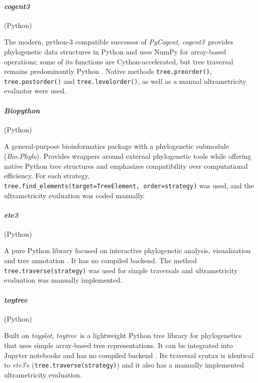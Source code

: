 \documentclass[11pt, a4paper]{article}
\newcommand{\cogent}{\textit{cogent3}}
\newcommand{\biopython}{\textit{Biopython}}
\newcommand{\ete}{\textit{ete3}}
\newcommand{\toytree}{\textit{toytree}}
\begin{document}
\paragraph{\cogent} (Python)

The modern, python-3 compatible successor of \textit{PyCogent}, \cogent\ provides phylogenetic data structures in Python and uses NumPy for array-based operations; some of its functions are Cython-accelerated, but tree traversal remains predominantly Python \cite{cogent32024,knight2007pycogent}. Native methods \texttt{tree.preorder()}, \texttt{tree.postorder()} and \texttt{tree.levelorder()}, as well as a manual ultrametricity evaluator were used. 

\paragraph{\biopython} (Python)

A general-purpose bioinformatics package with a phylogenetic submodule (\textit{Bio.Phylo}). Provides wrappers around external phylogenetic tools while offering native Python tree structures \cite{cock2009biopython} and emphasizes compatibility over computational efficiency. For each strategy, \\\texttt{tree.find\_elements(target=TreeElement, order=strategy)} was used, and the ultrametricity evaluation was coded manually. 

\paragraph{\ete} (Python)

A pure Python library focused on interactive phylogenetic analysis, visualization and tree annotation \cite{huerta2016ete3}. It has no compiled backend. The method \texttt{tree.traverse(strategy)} was used for simple traversals and ultrametricity evaluation was manually implemented. 

\paragraph{\toytree} (Python)

Built on \textit{toyplot}, \toytree\ is a lightweight Python tree library for phylogenetics that uses simple array-based tree representations. It can be integrated into Jupyter notebooks and has no compiled backend \cite{eaton2020toytree}. Its traversal syntax is identical to \ete's (\texttt{tree.traverse(strategy)}) and it also has a manually implemented ultrametricity evaluation. 
\end{document}
